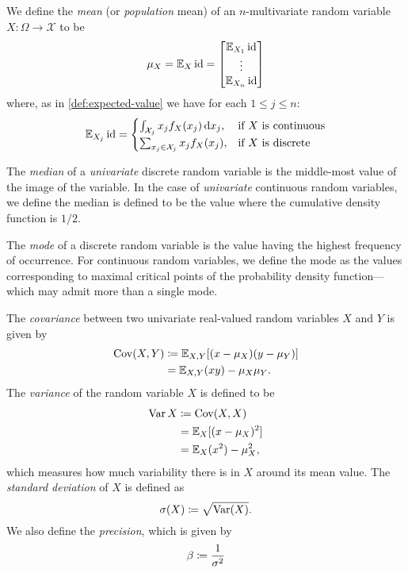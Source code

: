 \begin{definition}
\label{def:mean-of-random-variable}
We define the \emph{mean} (or \emph{population} mean) of an \(n\)-multivariate
random variable \(X: \Omega \to \mathcal{X}\) to be
\[
\mu_X = \operatorname{\mathbb{E}}_X \operatorname{id} =
\begin{bmatrix}
  \operatorname{\mathbb{E}}_{X_1} \operatorname{id} \\
  \vdots \\
  \operatorname{\mathbb{E}}_{X_n} \operatorname{id}
\end{bmatrix}
\]
where, as in \cref{def:expected-value} we have for each \(1 \leq j \leq n\):
\[
\operatorname{\mathbb{E}}_{X_j} \operatorname{id} =
\begin{cases}
  \int_{\mathcal{X}_j} x_j f_X(x_j)\, \mathrm{d} x_j, &\text{if } X \text{ is
                                                   continuous} \\
  \sum_{x_j \in \mathcal{X}_j} x_j f_X(x_j), &\text{if } X \text{ is discrete}
\end{cases}
\]

The \emph{median} of a \emph{univariate} discrete random variable is the middle-most
value of the image of the variable. In the case of \emph{univariate} continuous random
variables, we define the median is defined to be the value where the cumulative
density function is \(1/2\).

The \emph{mode} of a discrete random variable is the value having the highest
frequency of occurrence. For continuous random variables, we define the mode as
the values corresponding to maximal critical points of the probability density
function---which may admit more than a single mode.
\end{definition}

\begin{definition}
\label{def:covariance-univariate}
The \emph{covariance} between two univariate real-valued random variables \(X\)
and \(Y\) is given by
\begin{align*}
  \operatorname{Cov}(X, Y)
  &\coloneq \operatorname{\mathbb{E}}_{X, Y}[(x - \mu_X)(y - \mu_Y)] \\
  &= \operatorname{\mathbb{E}}_{X, Y}(x y) - \mu_X \mu_Y.
\end{align*}
The \emph{variance} of the random variable \(X\) is defined to be
\begin{align*}
\operatorname{Var} X
&\coloneq \operatorname{Cov}(X, X) \\
&= \operatorname{\mathbb{E}}_X[(x - \mu_X)^2] \\
&= \operatorname{\mathbb{E}}_X(x^2) - \mu_X^2,
\end{align*}
which measures how much variability there is in \(X\) around its mean value.
The \emph{standard deviation} of \(X\) is defined as
\[
\operatorname{\sigma}(X) \coloneq \sqrt{\operatorname{Var}(X)}.
\]
We also define the \emph{precision}, which is given by
\[
\operatorname{\beta} \coloneq \frac{1}{\operatorname{\sigma}^2}
\]
\end{definition}

